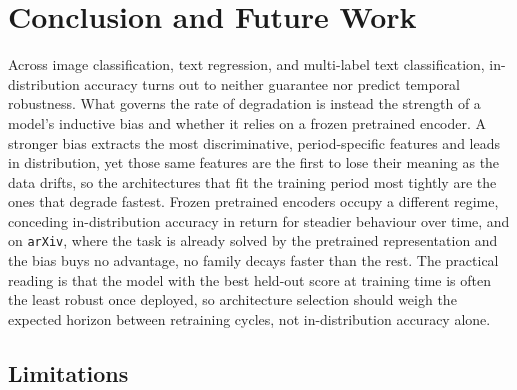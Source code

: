 \tightvspace{-5pt}
\section{Conclusion and Future Work}

Across image classification, text regression, and multi-label text classification, in-distribution accuracy turns out to neither guarantee nor predict temporal robustness. What governs the rate of degradation is instead the strength of a model's inductive bias and whether it relies on a frozen pretrained encoder. A stronger bias extracts the most discriminative, period-specific features and leads in distribution, yet those same features are the first to lose their meaning as the data drifts, so the architectures that fit the training period most tightly are the ones that degrade fastest. Frozen pretrained encoders occupy a different regime, conceding in-distribution accuracy in return for steadier behaviour over time, and on \texttt{arXiv}, where the task is already solved by the pretrained representation and the bias buys no advantage, no family decays faster than the rest. The practical reading is that the model with the best held-out score at training time is often the least robust once deployed, so architecture selection should weigh the expected horizon between retraining cycles, not in-distribution accuracy alone.

\tightvspace{-5pt}
\subsection{Limitations}

